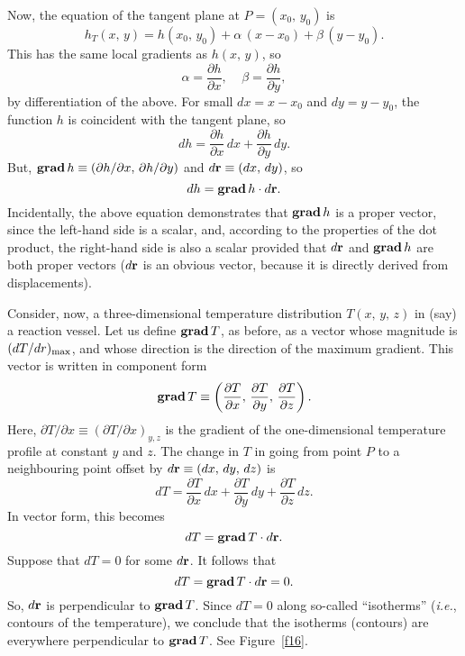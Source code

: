 Now, the equation of the tangent plane at $P=(x_0,\, y_0)$ is
\begin{equation}
h_T(x,\,y)= h(x_0,\,y_0) + \alpha\,(x-x_0)+\beta\,(y-y_0).
\end{equation}
This has the same local gradients as $h(x,\,y)$, so
\begin{equation}
\alpha = \frac{\partial h}{\partial x},~~~~~\beta= \frac{\partial h}{\partial y},
\end{equation}
by differentiation of the above.
For small $dx=x-x_0$ and $dy=y-y_0$, the function $h$ is coincident with the tangent
plane, so
\begin{equation}
dh = \frac{\partial h}{\partial x}\, dx +\frac{\partial h}
{\partial y}\, dy.
\end{equation}
But, ${\bf grad}\,h \equiv (\partial h/\partial x, \,\partial h/\partial y)$ and
$d{\bf r} \equiv (dx, \,dy)$, so
\begin{equation}
dh = {\bf grad}\,h \cdot d{\bf r}.
\end{equation}
Incidentally, the above equation demonstrates that ${\bf grad}\,h$ is a proper vector,
since the left-hand side is a scalar, and, according to the properties of the dot
product, the right-hand side is also a scalar provided that $d{\bf r}$ and
${\bf grad}\,h$ are both 
proper vectors ($d{\bf r}$ is an obvious vector, because it is
directly derived from displacements).

Consider, now, a three-dimensional temperature distribution $T(x,\,y,\,z)$ in 
(say) a
reaction vessel.  Let us define
${\bf grad}\,T$, as before, as a vector whose magnitude is $(dT/dr)_{\rm max}$,
and whose direction is the direction of the maximum gradient. 
This vector is written in component form
\begin{equation}
{\bf grad}\,T \equiv \left(\frac{\partial T}{\partial x}, \,\frac{\partial T}{\partial y},\,
\frac{\partial T}{\partial z}\right).
\end{equation}
Here, $\partial T/\partial x\equiv (\partial T/\partial x)_{y, z}$ is the
gradient of the one-dimensional temperature profile at constant $y$ and $z$. 
The change in $T$ in going from point $P$ to a neighbouring point offset by
$d{\bf r}\equiv (dx,\,dy,\,dz)$ is
\begin{equation}
dT = \frac{\partial T}{\partial x}\,dx +\frac{\partial T}{\partial y}\,dy+
 \frac{\partial T}{\partial z}\,dz.
\end{equation}
In vector form, this becomes
\begin{equation}
dT = {\bf grad}\,T \cdot d{\bf r}.
\end{equation}
Suppose that $dT=0$ for some $d{\bf r}$. It follows that
\begin{equation}
dT = {\bf grad}\,T \cdot d{\bf r} = 0.
\end{equation}
So, $d{\bf r}$ is perpendicular to ${\bf grad}\,T$. Since $dT=0$ along so-called
``isotherms'' ({\em i.e.}, contours of the temperature), we conclude that the isotherms
(contours) are everywhere perpendicular to ${\bf grad}\,T$. See Figure~\ref{f16}.

